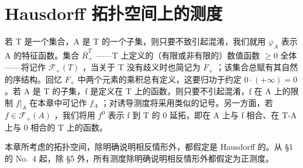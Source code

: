 \chapter{Hausdorff 拓扑空间上的测度}

若 T 是一个集合，A 是 T 的一个子集，则只要不致引起混淆，我们就用 \(\varphi_{A}\) 表示 A 的特征函数。集合 \(\overline{R}_{+}^{T}\) ——T 上定义的（有限或非有限的）数值函数 \(\geqslant0\) 全体——将记作 \(\mathcal{F}_{+}(T)\) ，当关于 T 没有歧义时也简记为 \(F_{+}\) ；该集合总赋有其自然的序结构。回忆 \(F_{+}\) 中两个元素的乘积总有定义，这要归功于约定 \(0\cdot(+\infty)=0\) 。若 A 是 T 的子集，f 是定义在 T 上的函数，则只要不引起混淆，f 在 A 上的限制 \(f|_{A}\) 在本章中可记作 \(f_{A}\) ；对诱导测度将采用类似的记号。另一方面，若 \(f\in\mathcal{F}_{+}(A)\) ，我们将用 \(f^{0}\) 表示 f 到 T 的 0 延拓，即在 A 上与 f 相合、在 T-A 上与 0 相合的 T 上的函数。

本章所考虑的拓扑空间，除明确说明相反情形外，都假定是 Hausdorff 的。从 §1 的 No.~4 起，除 §5 外，所有测度除明确说明相反情形外都假定为正测度。

